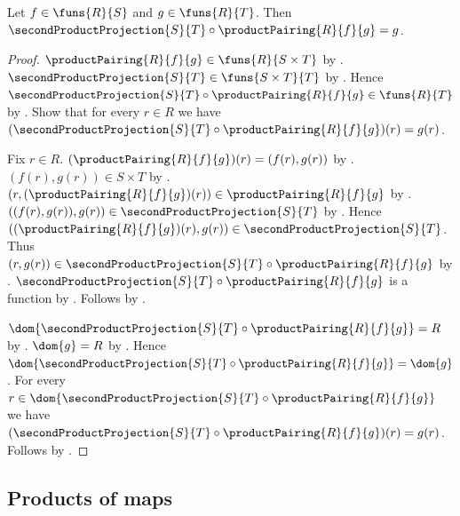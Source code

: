 \begin{theorem}\label{second_projection_of_product_pairing}
    Let $f\in\funs{R}{S}$ and $g\in\funs{R}{T}$.
    Then $\secondProductProjection{S}{T}\circ
        \productPairing{R}{f}{g}=g$.
\end{theorem}
\begin{proof}
    $\productPairing{R}{f}{g}\in\funs{R}{S\times T}$ by
        .
    $\secondProductProjection{S}{T}\in\funs{S\times T}{T}$ by
        .
    Hence $\secondProductProjection{S}{T}\circ
        \productPairing{R}{f}{g}\in\funs{R}{T}$ by
        .
    Show that for every $r\in R$ we have
        $(\secondProductProjection{S}{T}\circ
            \productPairing{R}{f}{g})(r)=g(r)$.
    \begin{subproof}
        Fix $r\in R$.
        $(\productPairing{R}{f}{g})(r)=(f(r),g(r))$ by
            .
        $(f(r),g(r))\in S\times T$ by
            .
        $(r,(\productPairing{R}{f}{g})(r))
            \in\productPairing{R}{f}{g}$ by
            .
        $((f(r),g(r)),g(r))\in
            \secondProductProjection{S}{T}$ by
            .
        Hence $((\productPairing{R}{f}{g})(r),g(r))\in
            \secondProductProjection{S}{T}$.
        Thus $(r,g(r))\in\secondProductProjection{S}{T}\circ
            \productPairing{R}{f}{g}$ by .
        $\secondProductProjection{S}{T}\circ
            \productPairing{R}{f}{g}$ is a function by
            .
        Follows by .
    \end{subproof}
    $\dom{\secondProductProjection{S}{T}\circ
        \productPairing{R}{f}{g}}=R$ by .
    $\dom{g}=R$ by .
    Hence $\dom{\secondProductProjection{S}{T}\circ
        \productPairing{R}{f}{g}}=\dom{g}$.
    For every $r\in\dom{\secondProductProjection{S}{T}\circ
        \productPairing{R}{f}{g}}$ we have
        $(\secondProductProjection{S}{T}\circ
            \productPairing{R}{f}{g})(r)=g(r)$.
    Follows by .
\end{proof}

\subsection{Products of maps}

